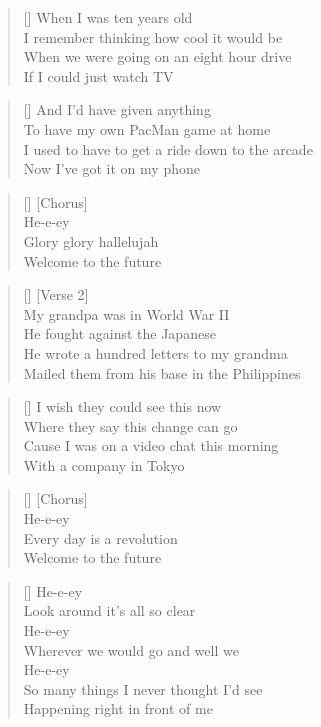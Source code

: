 \documentclass{report}
\begin{document}
\settowidth{\versewidth}{When we were going on an eight hour drive}
\begin{verse}[\versewidth]
When I was ten years old\\
I remember thinking how cool it would be\\
When we were going on an eight hour drive\\
If I could just watch TV\\
\end{verse}
\begin{verse}[\versewidth]
And I'd have given anything\\
To have my own PacMan game at home\\
I used to have to get a ride down to the arcade\\
Now I've got it on my phone\\
\end{verse}
\begin{verse}[\versewidth]
[Chorus]\\
He-e-ey\\
Glory glory hallelujah\\
Welcome to the future\\
\end{verse}
\begin{verse}[\versewidth]
[Verse 2]\\
My grandpa was in World War II\\
He fought against the Japanese\\
He wrote a hundred letters to my grandma\\
Mailed them from his base in the Philippines\\
\end{verse}
\begin{verse}[\versewidth]
I wish they could see this now\\
Where they say this change can go\\
Cause I was on a video chat this morning\\
With a company in Tokyo\\
\end{verse}
\begin{verse}[\versewidth]
[Chorus]\\
He-e-ey\\
Every day is a revolution\\
Welcome to the future\\
\end{verse}
\begin{verse}[\versewidth]
He-e-ey\\
Look around it's all so clear\\
He-e-ey\\
Wherever we would go and well we\\
He-e-ey\\
So many things I never thought I'd see\\
Happening right in front of me\\
\end{verse}
\end{document}
